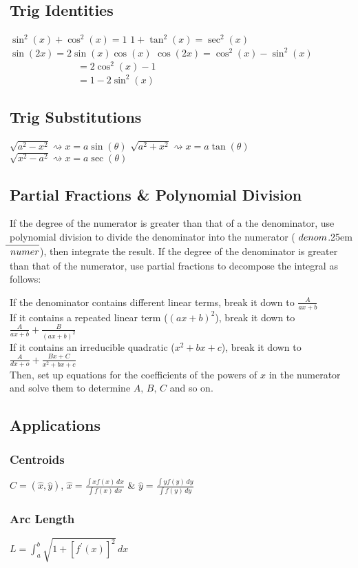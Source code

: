 \documentclass[10pt,landscape,letterpaper]{cheatsheet}
\newcommand\longdiv[2]{%
$\strut#1$\kern.25em\smash{\raise.3ex\hbox{$\big)$}}$\mkern-8mu
        \overline{\enspace\strut#2}$}
\begin{document}
\subsection*{Trig Identities}
$\sin^2(x)+\cos^2(x)=1$
$1+\tan^2(x)=\sec^2(x)$
$\sin(2x)=2\sin(x)\cos(x)$
$\cos(2x)=\cos^2(x)-\sin^2(x)$\\
~~~~~~~~~~~~~~$=2\cos^2(x)-1$\\
~~~~~~~~~~~~~~$=1-2\sin^2(x)$

\subsection*{Trig Substitutions}
$\sqrt{a^2-x^2} \rightsquigarrow x=a\sin(\theta)$
$\sqrt{a^2+x^2} \rightsquigarrow x=a\tan(\theta)$
$\sqrt{x^2-a^2} \rightsquigarrow x=a\sec(\theta)$

\subsection*{Partial Fractions \& Polynomial Division}
If the degree of the numerator is greater than that of a the denominator, use polynomial division to
divide the denominator into the numerator (\longdiv{denom}{numer}), then integrate the result. If the degree of the denominator is greater than
that of the numerator, use partial fractions to decompose the integral as follows:

If the denominator contains different linear terms, break it down to $\frac{A}{ax+b}$ \\
If it contains a repeated linear term ($(ax+b)^2$), break it down to $\frac{A}{ax+b}+\frac{B}{(ax+b)^2}$ \\
If it contains an irreducible quadratic ($x^2+bx+c$), break it down to $\frac{A}{dx+o}+\frac{Bx+C}{x^2+bx+c}$ \\

Then, set up equations for the coefficients of the powers of $x$ in the numerator and solve them to determine $A,\,B,\,C$ and so on.
\subsection*{Applications}
\subsubsection*{Centroids}
$C = (\hat{x}, \hat{y})$,
$\hat{x} = \frac{\int xf(x) \,dx}{\int f(x) \,dx}$ \&
$\hat{y} = \frac{\int yf(y) \,dy}{\int f(y) \,dy}$
\subsubsection*{Arc Length}
$L = \int_{a}^{b} \sqrt{1+[f^{\prime}(x)]^2} \,dx$
\end{document}

